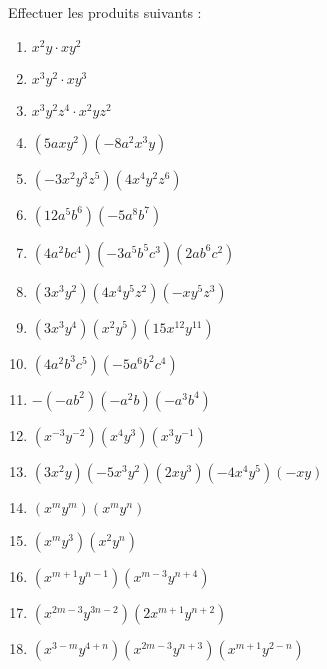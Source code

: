 \begin{exercice}Effectuer les produits suivants :
\begin{multicols}{2}
\begin{enumerate}
\item ${{x}^{2}}y\cdot x{{y}^{2}}$	
\item ${{x}^{3}}{{y}^{2}}\cdot x{{y}^{3}}$	
\item ${{x}^{3}}{{y}^{2}}{{z}^{4}}\cdot {{x}^{2}}y{{z}^{2}}$	
\item $\left( 5ax{{y}^{2}} \right)\left( -8{{a}^{2}}{{x}^{3}}y \right)$	
\item $\left( -3{{x}^{2}}{{y}^{3}}{{z}^{5}} \right)\left( 4{{x}^{4}}{{y}^{2}}{{z}^{6}} \right)$	
\item $\left( 12{{a}^{5}}{{b}^{6}} \right)\left( -5{{a}^{8}}{{b}^{7}} \right)$	
\item $\left( 4{{a}^{2}}b{{c}^{4}} \right)\left( -3{{a}^{5}}{{b}^{5}}{{c}^{3}} \right)\left( 2a{{b}^{6}}{{c}^{2}} \right)$	\item $\left( 3{{x}^{3}}{{y}^{2}} \right)\left( 4{{x}^{4}}{{y}^{5}}{{z}^{2}} \right)\left( -x{{y}^{5}}{{z}^{3}} \right)$	
\item $\left( 3{{x}^{3}}{{y}^{4}} \right)\left( {{x}^{2}}{{y}^{5}} \right)\left( 15{{x}^{12}}{{y}^{11}} \right)$
\item $\left( 4{{a}^{2}}{{b}^{3}}{{c}^{5}} \right)\left( -5{{a}^{6}}{{b}^{2}}{{c}^{4}} \right)$	
\item $-\left( -a{{b}^{2}} \right)\left( -{{a}^{2}}b \right)\left( -{{a}^{3}}{{b}^{4}} \right)$
\item $\left( {{x}^{-3}}{{y}^{-2}} \right)\left( {{x}^{4}}{{y}^{3}} \right)\left( {{x}^{3}}{{y}^{-1}} \right)$
\item $\left( 3{{x}^{2}}y \right)\left( -5{{x}^{3}}{{y}^{2}} \right)\left( 2x{{y}^{3}} \right)\left( -4{{x}^{4}}{{y}^{5}} \right)\left( -xy \right)$
\item $\left( {{x}^{m}}{{y}^{m}} \right)\left( {{x}^{m}}{{y}^{n}} \right)$
\item $\left( {{x}^{m}}{{y}^{3}} \right)\left( {{x}^{2}}{{y}^{n}} \right)$
\item $\left( {{x}^{m+1}}{{y}^{n-1}} \right)\left( {{x}^{m-3}}{{y}^{n+4}} \right)$
\item $\left( {{x}^{2m-3}}{{y}^{3n-2}} \right)\left( 2{{x}^{m+1}}{{y}^{n+2}} \right)$
\item $\left( {{x}^{3-m}}{{y}^{4+n}} \right)\left( {{x}^{2m-3}}{{y}^{n+3}} \right)\left( {{x}^{m+1}}{{y}^{2-n}} \right)$
\end{enumerate}
\end{multicols}
\end{exercice}

